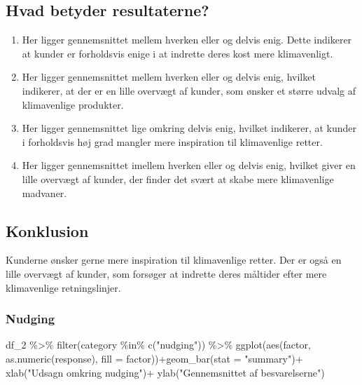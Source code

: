 \documentclass[
]{article}
\newenvironment{Shaded}{\begin{snugshade}}{\end{snugshade}}
\newcommand{\AttributeTok}[1]{\textcolor[rgb]{0.77,0.63,0.00}{#1}}
\newcommand{\FunctionTok}[1]{\textcolor[rgb]{0.00,0.00,0.00}{#1}}
\newcommand{\NormalTok}[1]{#1}
\newcommand{\SpecialCharTok}[1]{\textcolor[rgb]{0.00,0.00,0.00}{#1}}
\newcommand{\StringTok}[1]{\textcolor[rgb]{0.31,0.60,0.02}{#1}}
\providecommand{\tightlist}{%
  \setlength{\itemsep}{0pt}\setlength{\parskip}{0pt}}
\begin{document}
\hypertarget{hvad-betyder-resultaterne-2}{%
\subsection{Hvad betyder
resultaterne?}\label{hvad-betyder-resultaterne-2}}

\begin{enumerate}
\def\labelenumi{\arabic{enumi}.}
\tightlist
\item
  Her ligger gennemsnittet mellem hverken eller og delvis enig. Dette
  indikerer at kunder er forholdsvis enige i at indrette deres kost mere
  klimavenligt.
\item
  Her ligger gennemsnittet mellem hverken eller og delvis enig, hvilket
  indikerer, at der er en lille overvægt af kunder, som ønsker et større
  udvalg af klimavenlige produkter.
\item
  Her ligger gennemsnittet lige omkring delvis enig, hvilket indikerer,
  at kunder i forholdsvis høj grad mangler mere inspiration til
  klimavenlige retter.
\item
  Her ligger gennemsnittet imellem hverken eller og delvis enig, hvilket
  giver en lille overvægt af kunder, der finder det svært at skabe mere
  klimavenlige madvaner.
\end{enumerate}

\hypertarget{konklusion-2}{%
\subsection{Konklusion}\label{konklusion-2}}

Kunderne ønsker gerne mere inspiration til klimavenlige retter. Der er
også en lille overvægt af kunder, som forsøger at indrette deres
måltider efter mere klimavenlige retningslinjer.

\hypertarget{nudging}{%
\subsubsection{Nudging}\label{nudging}}

\begin{Shaded}
\begin{Highlighting}[]
\NormalTok{df\_2 }\SpecialCharTok{\%\textgreater{}\%} 
  \FunctionTok{filter}\NormalTok{(category }\SpecialCharTok{\%in\%} \FunctionTok{c}\NormalTok{(}\StringTok{"nudging"}\NormalTok{)) }\SpecialCharTok{\%\textgreater{}\%} 
  \FunctionTok{ggplot}\NormalTok{(}\FunctionTok{aes}\NormalTok{(factor, }\FunctionTok{as.numeric}\NormalTok{(response), }\AttributeTok{fill =}\NormalTok{ factor))}\SpecialCharTok{+}\FunctionTok{geom\_bar}\NormalTok{(}\AttributeTok{stat =} \StringTok{"summary"}\NormalTok{)}\SpecialCharTok{+} 
  \FunctionTok{xlab}\NormalTok{(}\StringTok{"Udsagn omkring nudging"}\NormalTok{)}\SpecialCharTok{+} \FunctionTok{ylab}\NormalTok{(}\StringTok{"Gennemsnittet af besvarelserne"}\NormalTok{)}
\end{Highlighting}
\end{Shaded}
\end{document}

